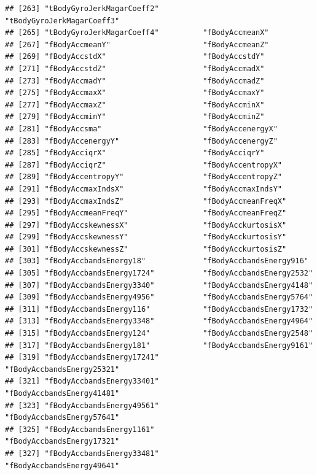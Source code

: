 \documentclass[
]{article}
\begin{document}
\begin{verbatim}
## [263] "tBodyGyroJerkMagarCoeff2"          "tBodyGyroJerkMagarCoeff3"         
## [265] "tBodyGyroJerkMagarCoeff4"          "fBodyAccmeanX"                    
## [267] "fBodyAccmeanY"                     "fBodyAccmeanZ"                    
## [269] "fBodyAccstdX"                      "fBodyAccstdY"                     
## [271] "fBodyAccstdZ"                      "fBodyAccmadX"                     
## [273] "fBodyAccmadY"                      "fBodyAccmadZ"                     
## [275] "fBodyAccmaxX"                      "fBodyAccmaxY"                     
## [277] "fBodyAccmaxZ"                      "fBodyAccminX"                     
## [279] "fBodyAccminY"                      "fBodyAccminZ"                     
## [281] "fBodyAccsma"                       "fBodyAccenergyX"                  
## [283] "fBodyAccenergyY"                   "fBodyAccenergyZ"                  
## [285] "fBodyAcciqrX"                      "fBodyAcciqrY"                     
## [287] "fBodyAcciqrZ"                      "fBodyAccentropyX"                 
## [289] "fBodyAccentropyY"                  "fBodyAccentropyZ"                 
## [291] "fBodyAccmaxIndsX"                  "fBodyAccmaxIndsY"                 
## [293] "fBodyAccmaxIndsZ"                  "fBodyAccmeanFreqX"                
## [295] "fBodyAccmeanFreqY"                 "fBodyAccmeanFreqZ"                
## [297] "fBodyAccskewnessX"                 "fBodyAcckurtosisX"                
## [299] "fBodyAccskewnessY"                 "fBodyAcckurtosisY"                
## [301] "fBodyAccskewnessZ"                 "fBodyAcckurtosisZ"                
## [303] "fBodyAccbandsEnergy18"             "fBodyAccbandsEnergy916"           
## [305] "fBodyAccbandsEnergy1724"           "fBodyAccbandsEnergy2532"          
## [307] "fBodyAccbandsEnergy3340"           "fBodyAccbandsEnergy4148"          
## [309] "fBodyAccbandsEnergy4956"           "fBodyAccbandsEnergy5764"          
## [311] "fBodyAccbandsEnergy116"            "fBodyAccbandsEnergy1732"          
## [313] "fBodyAccbandsEnergy3348"           "fBodyAccbandsEnergy4964"          
## [315] "fBodyAccbandsEnergy124"            "fBodyAccbandsEnergy2548"          
## [317] "fBodyAccbandsEnergy181"            "fBodyAccbandsEnergy9161"          
## [319] "fBodyAccbandsEnergy17241"          "fBodyAccbandsEnergy25321"         
## [321] "fBodyAccbandsEnergy33401"          "fBodyAccbandsEnergy41481"         
## [323] "fBodyAccbandsEnergy49561"          "fBodyAccbandsEnergy57641"         
## [325] "fBodyAccbandsEnergy1161"           "fBodyAccbandsEnergy17321"         
## [327] "fBodyAccbandsEnergy33481"          "fBodyAccbandsEnergy49641"         

\end{verbatim}
\end{document}
